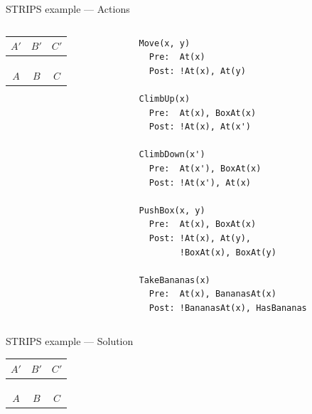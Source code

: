 \begin{frame}[fragile]{STRIPS example --- Actions}
	\begin{columns}
		\begin{column}{0.4\textwidth}
			\begin{tabular}{c|c|c}
				  $A'$  &   $B'$  &   $C'$  \\\hline
				\emptyy & \banana & \emptyy \\
				\emptyy & \emptyy & \emptyy \\
				\monkey & \emptyy & \boxbox \\\hline
				  $A$   &   $B$   &    $C$
			\end{tabular}
		\end{column}
		\begin{column}{0.58\textwidth}
			\begin{lstlisting}
Move(x, y)
  Pre:  At(x)
  Post: !At(x), At(y)

ClimbUp(x)
  Pre:  At(x), BoxAt(x)
  Post: !At(x), At(x')

ClimbDown(x')
  Pre:  At(x'), BoxAt(x)
  Post: !At(x'), At(x)

PushBox(x, y)
  Pre:  At(x), BoxAt(x)
  Post: !At(x), At(y),
        !BoxAt(x), BoxAt(y)

TakeBananas(x)
  Pre:  At(x), BananasAt(x)
  Post: !BananasAt(x), HasBananas
			\end{lstlisting}
		\end{column}
	\end{columns}
\end{frame}

\begin{frame}[fragile]{STRIPS example --- Solution}
	\begin{center}
			\begin{tabular}{c|c|c}
				  $A'$  &   $B'$  &   $C'$  \\\hline
				\emptyy & \banana & \emptyy \\
				\emptyy & \emptyy & \emptyy \\
				\monkey & \emptyy & \boxbox \\\hline
				  $A$   &   $B$   &    $C$
			\end{tabular}
	\end{center}
\end{frame}

